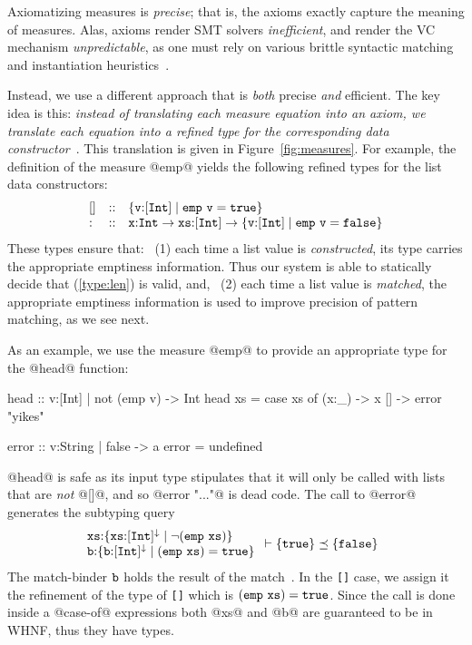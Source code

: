 Axiomatizing measures is \emph{precise}; that is, 
the axioms exactly capture the meaning of measures.
Alas, axioms render SMT solvers \emph{inefficient}, and render the VC mechanism \emph{unpredictable}, 
as one must rely on various brittle syntactic matching and instantiation heuristics~\cite{simplifyj}.

Instead, we use a different approach that is \emph{both} precise \emph{and} efficient.
The key idea is this: \emph{instead of translating each measure equation into an axiom, 
we translate each equation into a refined type for the corresponding data constructor}~\citep{LiquidPLDI09}.
This translation is given in Figure~\ref{fig:measures}.
For example, the definition of the measure @emp@ yields the following refined types for the list data constructors:
$$
\begin{array}{lcl}
\hnull  & :: & \ttreft{v}{[\tint]}{emp\ v = true}\\
{:}  & :: & \tfun{\ttx}{\tint}{\tfun{\ttxs}{[\tint]}{\ttreft{v}{[\tint]}{emp\ v = false}}}
\end{array}
$$
These types ensure that:
%
~(1) each time a list value is \emph{constructed}, 
its type carries the appropriate emptiness information. 
Thus our system is able to statically decide that 
(\ref{type:len}) is valid, and,
~(2) each time a list value is \emph{matched}, 
the appropriate emptiness information is used to 
improve precision of pattern matching, as we see next.

\label{sec:pattern-match}
As an example, we use the measure @emp@ to 
provide an appropriate type for the @head@ function:
%
\begin{code}
  head    :: {v:[Int] | not (emp v)} -> Int 
  head xs = case xs of
              (x:_) -> x
              []    -> error "yikes"  

  error   :: {v:String | false} -> a
  error   = undefined
\end{code}
%
@head@ is safe as its input type stipulates that it will only 
be called with lists that are \emph{not} @[]@, and so
@error "..."@ is dead code.
%
The call to @error@ generates the subtyping query
%
\begin{align*}
	\begin{array}{l}
   \tbind{\ttxs}{\tref{\ttxs}{[\tint]}{\trivial}{\lnot (\ttemp\ \ttxs)}}\\
   \tbind{\ttb}{\tttref{\ttb}{[\tint]}{\trivial}{(\ttemp\ \ttxs)= true}} 	
	\end{array} & \vdash \subtref{\tttrue}{\ttfalse} 
\end{align*}
%
The match-binder $\mathtt{b}$ holds the result of the 
match~\cite{SulzmannCJD07}. In the \texttt{[]} case,
we assign it the refinement of the type of \texttt{[]} 
which is $(\mathtt{emp}\ \mathtt{xs}) = \mathtt{true}$. %
%
Since the call is done inside a @case-of@ expressions 
both @xs@ and @b@ are guaranteed to be in WHNF,
thus they have \Wnf types. 
  
